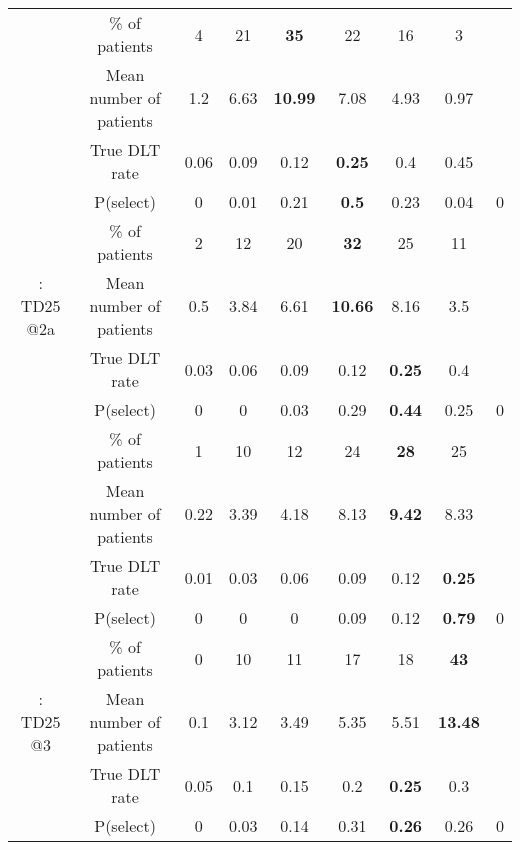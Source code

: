 \begin{table}[h!]
\begin{singlespace}
{\begin{tabular}[t]{ccccccccc}
			\rowcolor{gray!6}   & \% of patients & 4 & 21 & \textbf{35} & 22 & 16 & 3 & \\
			
			\rowcolor{gray!6}  \multirow{-4}{*}{\centering\arraybackslash 3: TD25 @1} & Mean number of patients & 1.2 & 6.63 & \textbf{10.99} & 7.08 & 4.93 & 0.97 & \\
			\cmidrule{1-9}
			& True DLT rate & 0.06 & 0.09 & 0.12 & \textbf{0.25} & 0.4 & 0.45 & \\
			
			& P(select) & 0 & 0.01 & 0.21 & \textbf{0.5} & 0.23 & 0.04 & 0\\
			
			& \% of patients & 2 & 12 & 20 & \textbf{32} & 25 & 11 & \\
			
			\multirow{-4}{*}{\centering\arraybackslash 4: TD25 @2a} & Mean number of patients & 0.5 & 3.84 & 6.61 & \textbf{10.66} & 8.16 & 3.5 & \\
			\cmidrule{1-9}
			\rowcolor{gray!6}   & True DLT rate & 0.03 & 0.06 & 0.09 & 0.12 & \textbf{0.25} & 0.4 & \\
			
			\rowcolor{gray!6}   & P(select) & 0 & 0 & 0.03 & 0.29 & \textbf{0.44} & 0.25 & 0\\
			
			\rowcolor{gray!6}   & \% of patients & 1 & 10 & 12 & 24 & \textbf{28} & 25 & \\
			
			\rowcolor{gray!6}  \multirow{-4}{*}{\centering\arraybackslash 5: TD25 @2b} & Mean number of patients & 0.22 & 3.39 & 4.18 & 8.13 & \textbf{9.42} & 8.33 & \\
			\cmidrule{1-9}
			& True DLT rate & 0.01 & 0.03 & 0.06 & 0.09 & 0.12 & \textbf{0.25} & \\
			
			& P(select) & 0 & 0 & 0 & 0.09 & 0.12 & \textbf{0.79} & 0\\
			
			& \% of patients & 0 & 10 & 11 & 17 & 18 & \textbf{43} & \\
			
			\multirow{-4}{*}{\centering\arraybackslash 6: TD25 @3} & Mean number of patients & 0.1 & 3.12 & 3.49 & 5.35 & 5.51 & \textbf{13.48} & \\
			\cmidrule{1-9}
			\rowcolor{gray!6}   & True DLT rate & 0.05 & 0.1 & 0.15 & 0.2 & \textbf{0.25} & 0.3 & \\
			
			\rowcolor{gray!6}   & P(select) & 0 & 0.03 & 0.14 & 0.31 & \textbf{0.26} & 0.26 & 0\\
			

\end{tabular}}
\end{singlespace}
\end{table}
